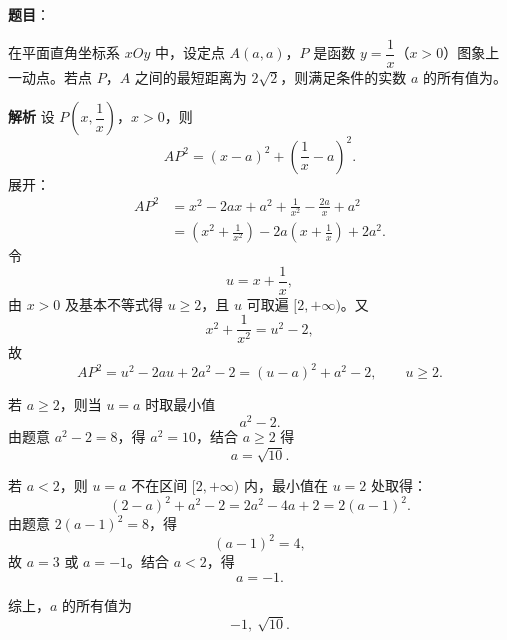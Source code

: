 \begin{answer}

\textbf{题目}：

在平面直角坐标系 $xOy$ 中，设定点 $A(a,a)$，$P$ 是函数 $y=\dfrac1x$（$x>0$）图象上一动点。若点 $P$，$A$ 之间的最短距离为 $2\sqrt2$，则满足条件的实数 $a$ 的所有值为\gkblank{}。

\textbf{解析}
设 $P\left(x,\dfrac1x\right)$，$x>0$，则
\nopagebreak[4]
\[AP^2=(x-a)^2+\left(\frac1x-a\right)^2.\]
展开：
\nopagebreak[4]
\[\begin{aligned}
AP^2
&=x^2-2ax+a^2+\frac1{x^2}-\frac{2a}{x}+a^2\\
&=\left(x^2+\frac1{x^2}\right)-2a\left(x+\frac1x\right)+2a^2.
\end{aligned}\]
令
\nopagebreak[4]
\[u=x+\frac1x,\]
由 $x>0$ 及基本不等式得 $u\geqslant2$，且 $u$ 可取遍 $[2,+\infty)$。又
\nopagebreak[4]
\[x^2+\frac1{x^2}=u^2-2,\]
故
\nopagebreak[4]
\[AP^2=u^2-2au+2a^2-2=(u-a)^2+a^2-2,\qquad u\geqslant2.\]

若 $a\geqslant2$，则当 $u=a$ 时取最小值
\nopagebreak[4]
\[a^2-2.\]
由题意 $a^2-2=8$，得 $a^2=10$，结合 $a\geqslant2$ 得
\nopagebreak[4]
\[a=\sqrt{10}.\]

若 $a<2$，则 $u=a$ 不在区间 $[2,+\infty)$ 内，最小值在 $u=2$ 处取得：
\nopagebreak[4]
\[(2-a)^2+a^2-2=2a^2-4a+2=2(a-1)^2.\]
由题意 $2(a-1)^2=8$，得
\nopagebreak[4]
\[(a-1)^2=4,\]
故 $a=3$ 或 $a=-1$。结合 $a<2$，得
\nopagebreak[4]
\[a=-1.\]

综上，$a$ 的所有值为
\nopagebreak[4]
\[-1,\ \sqrt{10}.\]


\end{answer}
